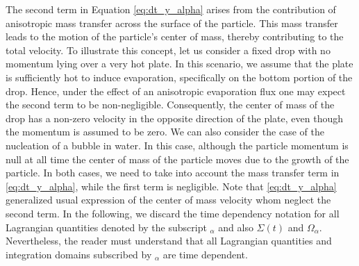 The second term in Equation \ref{eq:dt_y_alpha} arises from the contribution of anisotropic mass transfer across the surface of the particle. 
This mass transfer leads to the motion of the particle's center of mass, thereby contributing to the total velocity.
To illustrate this concept, let us consider a fixed drop with no momentum lying over a very hot plate.
In this scenario, we assume that the plate is sufficiently hot to induce evaporation, specifically on the bottom portion of the drop.
Hence, under the effect of an anisotropic evaporation flux one may expect the second term to be non-negligible.
Consequently, the center of mass of the drop has a non-zero velocity in the opposite direction of the plate, even though the momentum is assumed to be zero.
We can also consider the case of the nucleation of a bubble in water. 
In this case, although the particle momentum is null at all time the center of mass of the particle moves due to the growth of the particle. 
In both cases, we need to take into account the mass transfer term in \ref{eq:dt_y_alpha}, while the first term is negligible. 
Note that \ref{eq:dt_y_alpha} generalized usual expression of the center of mass velocity whom neglect the second term.
In the following, we discard the time dependency notation for all Lagrangian quantities denoted by the subscript $_\alpha$ and also $\Sigma(t)$ and $\Omega_\alpha$.
Nevertheless, the reader must understand that all Lagrangian quantities and integration domains subscribed by $_\alpha$ are time dependent. 

